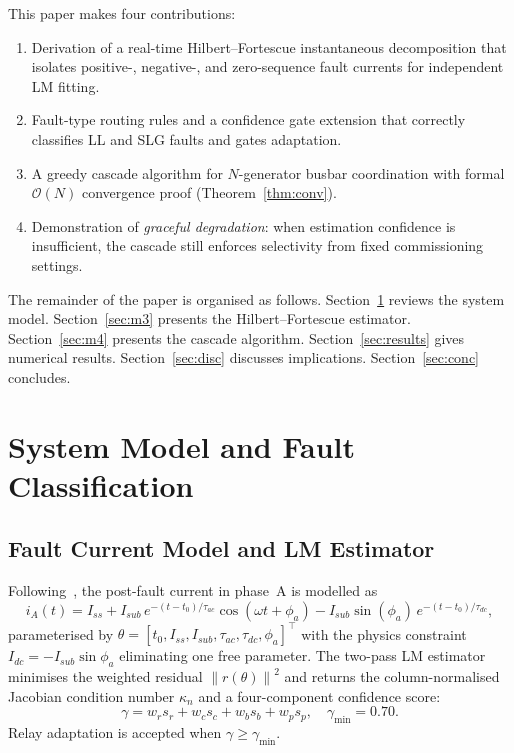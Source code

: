 \documentclass[journal,twoside,10pt]{IEEEtran}
\newcommand{\norm}[1]{\left\|#1\right\|}
\begin{document}
This paper makes four contributions:

\begin{enumerate}
  \item Derivation of a real-time Hilbert--Fortescue instantaneous
        decomposition that isolates positive-, negative-, and
        zero-sequence fault currents for independent LM fitting.
  \item Fault-type routing rules and a confidence gate extension that
        correctly classifies LL and SLG faults and gates adaptation.
  \item A greedy cascade algorithm for $N$-generator busbar coordination
        with formal $\mathcal{O}(N)$ convergence proof (Theorem~\ref{thm:conv}).
  \item Demonstration of \emph{graceful degradation}: when estimation
        confidence is insufficient, the cascade still enforces selectivity
        from fixed commissioning settings.
\end{enumerate}

The remainder of the paper is organised as follows.
Section~\ref{sec:model} reviews the system model.
Section~\ref{sec:m3} presents the Hilbert--Fortescue estimator.
Section~\ref{sec:m4} presents the cascade algorithm.
Section~\ref{sec:results} gives numerical results.
Section~\ref{sec:disc} discusses implications.
Section~\ref{sec:conc} concludes.

\section{System Model and Fault Classification}
\label{sec:model}

\subsection{Fault Current Model and LM Estimator}
\label{sec:model:lm}

Following~\cite{EluvathingalPaperA}, the post-fault current in phase~A is
modelled as
\begin{equation}
  i_A(t) = I_{ss} + I_{sub}\,e^{-(t-t_0)/\tau_{ac}}\cos(\omega t + \phi_a)
            - I_{sub}\sin(\phi_a)\,e^{-(t-t_0)/\tau_{dc}},
  \label{eq:model}
\end{equation}
parameterised by $\theta = [t_0, I_{ss}, I_{sub}, \tau_{ac}, \tau_{dc},
\phi_a]^\top$ with the physics constraint $I_{dc} = -I_{sub}\sin\phi_a$
eliminating one free parameter.
The two-pass LM estimator~\cite{EluvathingalPaperA,Marquardt1963} minimises
the weighted residual $\norm{r(\theta)}^2$ and returns the column-normalised
Jacobian condition number $\kappa_n$ and a four-component confidence score:
\begin{equation}
  \gamma = w_r s_r + w_c s_c + w_b s_b + w_p s_p, \quad \gamma_{\min} = 0.70.
  \label{eq:gate}
\end{equation}
Relay adaptation is accepted when $\gamma \geq \gamma_{\min}$.
\end{document}
